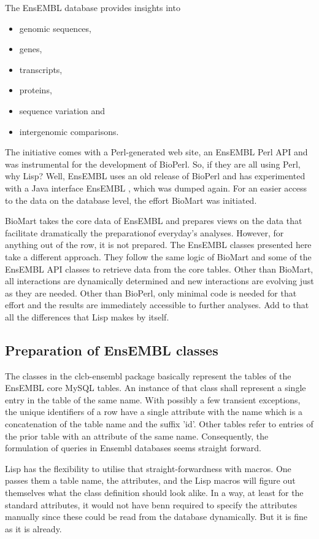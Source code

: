 \documentclass{book}
\newcommand\ensembl{EnsEMBL }
\begin{document}
The \ensembl database provides insights into 
\begin{itemize}
\item genomic sequences,
\item genes,
\item transcripts,
\item proteins,
\item sequence variation and
\item intergenomic comparisons.
\end{itemize}
The initiative comes with a Perl-generated web site, an \ensembl Perl
API and was instrumental for the development of BioPerl. So, if they
are all using Perl, why Lisp? Well, \ensembl uses an old release of
BioPerl and has experimented with a Java interface \ensembl, which was
dumped again. For an easier access to the data on the database level,
the effort BioMart was initiated.

BioMart takes the core data of \ensembl and prepares views on the data that
facilitate dramatically the preparationof everyday's analyses. However,
for anything out of the row, it is not prepared. The \ensembl classes
presented here take a different approach. They follow the same logic of
BioMart and some of the \ensembl API classes to retrieve data from the core
tables. Other than BioMart, all interactions are dynamically determined
and new interactions are evolving just as they are needed. Other than
BioPerl, only minimal code is needed for that effort and the results
are immediately accessible to further analyses. Add to that all the
differences that Lisp makes by itself.

\subsection{Preparation of \ensembl classes}

The classes in the clcb-ensembl package basically represent the tables of
the \ensembl core MySQL tables. An instance of that class shall represent 
a single entry in the table of the same name. With possibly a few transient
exceptions, the unique identifiers of a row have a single attribute with the 
name which is a concatenation of the table name and the suffix 'id'. Other
tables refer to entries of the prior table with an attribute of the same name.
Consequently, the formulation of queries in Ensembl databases seems straight
forward.

Lisp has the flexibility to utilise that straight-forwardness with
macros. One passes them a table name, the attributes, and the Lisp macros
will figure out themselves what the class definition should look alike.
In a way, at least for the standard attributes, it would not have benn required to
specify the attributes manually since these could be read from the database dynamically.
But it is fine as it is already.
\end{document}
